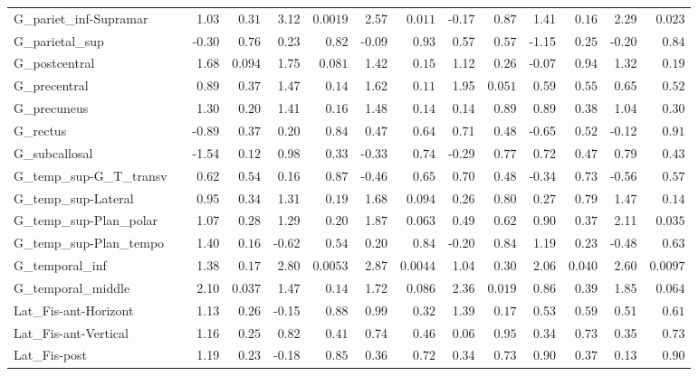 {\begin{longtable}{llrrrrrrrrrrrr}
G\_pariet\_inf-Supramar &  & 1.03 & $0.31$ & 3.12 & $0.0019$ & 2.57 & $0.011$ & -0.17 & $0.87$ & 1.41 & $0.16$ & 2.29 & $0.023$ \\
G\_parietal\_sup &  & -0.30 & $0.76$ & 0.23 & $0.82$ & -0.09 & $0.93$ & 0.57 & $0.57$ & -1.15 & $0.25$ & -0.20 & $0.84$ \\
G\_postcentral &  & 1.68 & $0.094$ & 1.75 & $0.081$ & 1.42 & $0.15$ & 1.12 & $0.26$ & -0.07 & $0.94$ & 1.32 & $0.19$ \\
G\_precentral &  & 0.89 & $0.37$ & 1.47 & $0.14$ & 1.62 & $0.11$ & 1.95 & $0.051$ & 0.59 & $0.55$ & 0.65 & $0.52$ \\
G\_precuneus &  & 1.30 & $0.20$ & 1.41 & $0.16$ & 1.48 & $0.14$ & 0.14 & $0.89$ & 0.89 & $0.38$ & 1.04 & $0.30$ \\
G\_rectus &  & -0.89 & $0.37$ & 0.20 & $0.84$ & 0.47 & $0.64$ & 0.71 & $0.48$ & -0.65 & $0.52$ & -0.12 & $0.91$ \\
G\_subcallosal &  & -1.54 & $0.12$ & 0.98 & $0.33$ & -0.33 & $0.74$ & -0.29 & $0.77$ & 0.72 & $0.47$ & 0.79 & $0.43$ \\
G\_temp\_sup-G\_T\_transv &  & 0.62 & $0.54$ & 0.16 & $0.87$ & -0.46 & $0.65$ & 0.70 & $0.48$ & -0.34 & $0.73$ & -0.56 & $0.57$ \\
G\_temp\_sup-Lateral &  & 0.95 & $0.34$ & 1.31 & $0.19$ & 1.68 & $0.094$ & 0.26 & $0.80$ & 0.27 & $0.79$ & 1.47 & $0.14$ \\
G\_temp\_sup-Plan\_polar &  & 1.07 & $0.28$ & 1.29 & $0.20$ & 1.87 & $0.063$ & 0.49 & $0.62$ & 0.90 & $0.37$ & 2.11 & $0.035$ \\
G\_temp\_sup-Plan\_tempo &  & 1.40 & $0.16$ & -0.62 & $0.54$ & 0.20 & $0.84$ & -0.20 & $0.84$ & 1.19 & $0.23$ & -0.48 & $0.63$ \\
G\_temporal\_inf &  & 1.38 & $0.17$ & 2.80 & $0.0053$ & 2.87 & $0.0044$ & 1.04 & $0.30$ & 2.06 & $0.040$ & 2.60 & $0.0097$ \\
G\_temporal\_middle &  & 2.10 & $0.037$ & 1.47 & $0.14$ & 1.72 & $0.086$ & 2.36 & $0.019$ & 0.86 & $0.39$ & 1.85 & $0.064$ \\
Lat\_Fis-ant-Horizont &  & 1.13 & $0.26$ & -0.15 & $0.88$ & 0.99 & $0.32$ & 1.39 & $0.17$ & 0.53 & $0.59$ & 0.51 & $0.61$ \\
Lat\_Fis-ant-Vertical &  & 1.16 & $0.25$ & 0.82 & $0.41$ & 0.74 & $0.46$ & 0.06 & $0.95$ & 0.34 & $0.73$ & 0.35 & $0.73$ \\
Lat\_Fis-post &  & 1.19 & $0.23$ & -0.18 & $0.85$ & 0.36 & $0.72$ & 0.34 & $0.73$ & 0.90 & $0.37$ & 0.13 & $0.90$ \\

\end{longtable}}
